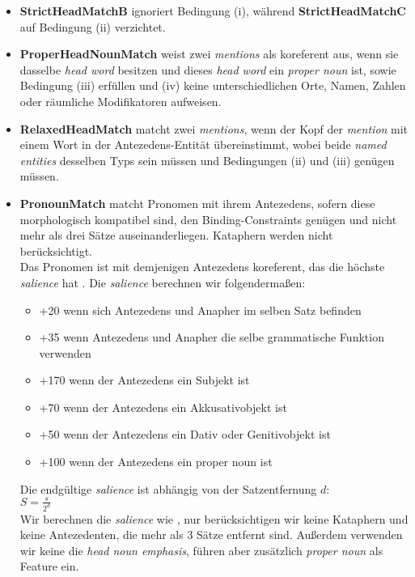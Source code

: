 \documentclass{scrartcl}
\begin{document}
\begin{itemize}
\item \textbf{StrictHeadMatchB} ignoriert Bedingung (i), während \textbf{StrictHeadMatchC}  auf Bedingung (ii) verzichtet.

\item \textbf{ProperHeadNounMatch} weist zwei \textit{mentions} als koreferent aus, wenn sie dasselbe \textit{head word} besitzen und dieses \textit{head word} ein \textit{proper noun} ist, sowie Bedingung (iii) erfüllen und (iv) keine unterschiedlichen Orte, Namen, Zahlen oder räumliche Modifikatoren aufweisen.

\item \textbf{RelaxedHeadMatch} matcht zwei \textit{mentions}, wenn der Kopf der \textit{mention} mit einem Wort in der Antezedens-Entität übereinstimmt, wobei beide \textit{named entities} desselben Typs sein müssen und Bedingungen (ii) und (iii) genügen müssen.

\item \textbf{PronounMatch} matcht Pronomen mit ihrem Antezedens, sofern diese morphologisch kompatibel sind, den Binding-Constraints genügen und nicht mehr als drei Sätze auseinanderliegen. Kataphern werden nicht berücksichtigt. \\
Das Pronomen ist mit demjenigen Antezedens koreferent, das die höchste \textit{salience} hat \cite{wunsch2006}. Die \textit{salience} berechnen wir folgendermaßen:

\begin{itemize}[]
	\item +20 wenn sich  Antezedens und Anapher im selben Satz befinden
	\item +35 wenn Antezedens und Anapher die selbe grammatische Funktion verwenden
	\item +170 wenn der Antezedens ein Subjekt ist
	\item +70 wenn der Antezedens ein Akkusativobjekt ist
	\item +50 wenn der Antezedens ein Dativ oder Genitivobjekt ist
	\item +100 wenn der Antezedens ein proper noun ist
\end{itemize}

Die endgültige \textit{salience} ist abhängig von der Satzentfernung $d$: \\
$S = \frac{s}{2^d}$ \\
Wir berechnen die \textit{salience} wie , nur berücksichtigen wir keine Kataphern und keine Antezedenten, die mehr als 3 Sätze entfernt sind. Außerdem verwenden wir keine die \textit{head noun emphasis}, führen aber zusätzlich \textit{proper noun} als Feature ein.  
\end{itemize}
\end{document}
